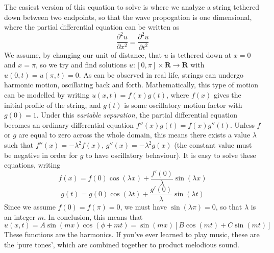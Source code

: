 The easiest version of this equation to solve is where we analyze a string tethered down between two endpoints, so that the wave propogation is one dimensional, where the partial differential equation can be written as
%
\[ \frac{\partial^2 u}{\partial x^2} = \frac{\partial^2 u}{\partial t^2} \]
%
We assume, by changing our unit of distance, that $u$ is tethered down at $x = 0$ and $x = \pi$, so we try and find solutions $u: [0,\pi] \times \mathbf{R} \to \mathbf{R}$ with $u(0,t) = u(\pi,t) = 0$. As can be observed  in real life, strings can undergo harmonic motion, oscillating back and forth. Mathematically, this type of motion can be modelled by writing $u(x,t) = f(x) g(t)$, where $f(x)$ gives the initial profile of the string, and $g(t)$ is some oscillatory motion factor with $g(0) = 1$. Under this {\it variable separation}, the partial differential equation becomes an ordinary differential equation $f''(x) g(t) = f(x) g''(t)$. Unless $f$ or $g$ are equal to zero across the whole domain, this means there exists a value $\lambda$ such that $f''(x) = - \lambda^2 f(x)$, $g''(x) = - \lambda^2 g(x)$ (the constant value must be negative in order for $g$ to have oscillatory behaviour). It is easy to solve these equations, writing
%
\[ f(x) = f(0) \cos(\lambda x) + \frac{f'(0)}{\lambda} \sin(\lambda x) \]
\[ g(t) = g(0) \cos(\lambda t) + \frac{g'(0)}{\lambda} \sin(\lambda t) \]
%
Since we assume $f(0) = f(\pi) = 0$, we must have $\sin(\lambda \pi) = 0$, so that $\lambda$ is an integer $m$. In conclusion, this means that
%
\[ u(x,t) = A \sin(mx) \cos(\phi + mt) = \sin(mx)[B \cos(mt) + C \sin(mt)] \]
%
These functions are the harmonics. If you've ever learned to play music, these are the `pure tones', which are combined together to product melodious sound.


